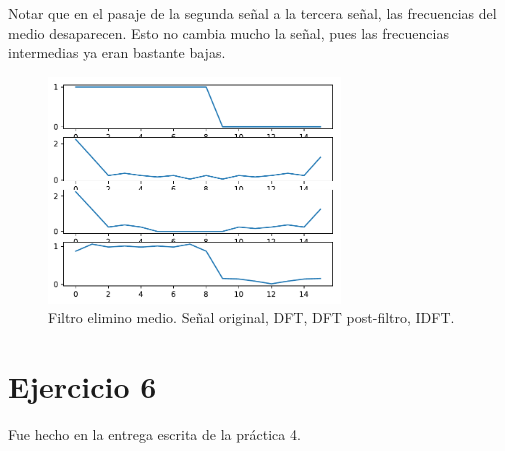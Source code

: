 \documentclass[11pt, spanish]{article}
\begin{document}
Notar que en el pasaje de la segunda señal a la tercera señal, las frecuencias del medio desaparecen.
Esto no cambia mucho la señal, pues las frecuencias intermedias ya eran bastante bajas.
\begin{figure}[H]
\centering
  \includegraphics[height=6cm]{informe-imgs/ej2-elimino-medio.pdf}
  \caption{Filtro elimino medio. Señal original, DFT, DFT post-filtro, IDFT.}
\end{figure}

\newpage
\section{Ejercicio 6}
Fue hecho en la entrega escrita de la práctica 4.
\end{document}
